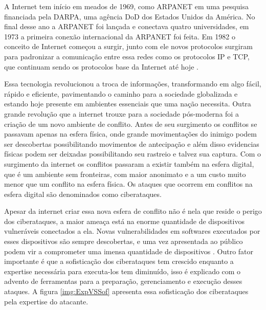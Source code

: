 A Internet tem início em meados de 1969, como ARPANET em uma pesquisa financiada pela \acrfull{DARPA}, uma agência \acrfull{DoD} dos Estados Unidos da América. No final desse ano a ARPANET foi lançada e conectava quatro universidades, em 1973 a primeira conexão internacional da ARPANET foi feita. Em 1982 o conceito de Internet começou a surgir, junto com ele novos protocolos surgiram para padronizar a comunicação entre essa redes como os protocolos IP e TCP, que continuam sendo os protocolos base da Internet até hoje \cite{Lipson2002TrackingAT}.

Essa tecnologia revolucionou a troca de informações, transformando em algo fácil, rápido e eficiente, pavimentando o caminho para a sociedade globalizada e estando hoje presente em ambientes essenciais que uma nação necessita. Outra grande revolução que a internet trouxe para a sociedade pós-moderna foi a criação de um novo ambiente de conflito. Antes de seu surgimento os conflitos se passavam apenas na esfera física, onde grande movimentações do inimigo podem ser descobertas possibilitando movimentos de antecipação e além disso evidencias físicas podem ser deixadas possibilitando seu rastreio e talvez sua captura. Com o surgimento da internet os conflitos passaram a existir também na esfera digital, que é um ambiente sem fronteiras, com maior anonimato e a um custo muito menor que um conflito na esfera física.  Os ataques que ocorrem em conflitos na esfera digital são denominados como ciberataques.

Apesar da internet criar essa nova esfera de conflito não é nela que reside o perigo dos ciberataques, a maior ameaça está na enorme quantidade de dispositivos vulneráveis conectados a ela. Novas vulnerabilidades em softwares executados por esses dispositivos são sempre descobertas, e uma vez apresentada ao público podem vir a comprometer uma imensa quantidade de dispositivos \cite{Lipson2002TrackingAT}. Outro fator importante é que a sofisticação dos ciberataques tem crescido enquanto a expertise necessária para executa-los tem diminuído, isso é explicado com o advento de ferramentas para a preparação, gerenciamento e execução desses ataques. A figura \ref{img:ExpVSSof} apresenta essa sofisticação dos ciberataques pela expertise do atacante.


